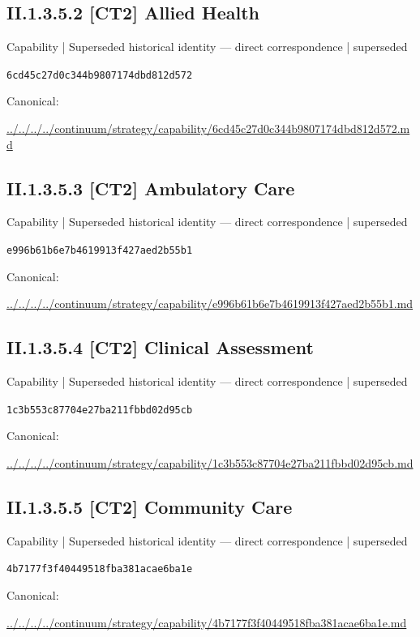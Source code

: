\documentclass[10pt,a4paper]{article}
\begin{document}
\subsection*{II.1.3.5.2 [CT2] Allied Health}
{\small Capability | Superseded historical identity — direct correspondence | superseded}\par
\texttt{6cd45c27d0c344b9807174dbd812d572}\par
Canonical: \par
{\footnotesize\url{../../../../continuum/strategy/capability/6cd45c27d0c344b9807174dbd812d572.md}}\par
\subsection*{II.1.3.5.3 [CT2] Ambulatory Care}
{\small Capability | Superseded historical identity — direct correspondence | superseded}\par
\texttt{e996b61b6e7b4619913f427aed2b55b1}\par
Canonical: \par
{\footnotesize\url{../../../../continuum/strategy/capability/e996b61b6e7b4619913f427aed2b55b1.md}}\par
\subsection*{II.1.3.5.4 [CT2] Clinical Assessment}
{\small Capability | Superseded historical identity — direct correspondence | superseded}\par
\texttt{1c3b553c87704e27ba211fbbd02d95cb}\par
Canonical: \par
{\footnotesize\url{../../../../continuum/strategy/capability/1c3b553c87704e27ba211fbbd02d95cb.md}}\par
\subsection*{II.1.3.5.5 [CT2] Community Care}
{\small Capability | Superseded historical identity — direct correspondence | superseded}\par
\texttt{4b7177f3f40449518fba381acae6ba1e}\par
Canonical: \par
{\footnotesize\url{../../../../continuum/strategy/capability/4b7177f3f40449518fba381acae6ba1e.md}}\par
\end{document}
